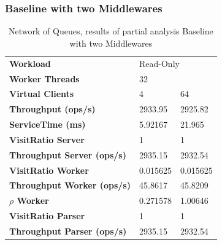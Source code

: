 \documentclass[11pt,a4paper]{article}
\begin{document}
\newpage
\subsubsection*{Baseline with two Middlewares}

\begin{table}[!htb]
\centering
    \caption{Network of Queues, results of partial analysis Baseline with two Middlewares}
\begin{tabular}{lll}
\toprule
    \textbf{Workload}& \multicolumn{2}{l}{Read-Only} \\
    \textbf{Worker Threads} & \multicolumn{2}{l}{32} \\
    \textbf{Virtual Clients} &        4  &        64 \\
\midrule
    \textbf{Throughput (ops/s)}                 &   2933.95 &   2925.82 \\
    \textbf{ServiceTime (ms)}                   &   5.92167 &    21.965 \\   
    \textbf{VisitRatio Server}                  &         1 &         1 \\
    \textbf{Throughput Server (ops/s)}          &   2935.15 &   2932.54 \\        
    \textbf{VisitRatio Worker}                  &  0.015625 &  0.015625 \\ 
    \textbf{Throughput Worker (ops/s)}          &   45.8617 &   45.8209 \\ 
    \textbf{$\rho$ Worker}                      &  0.271578 &   1.00646 \\
    \textbf{VisitRatio Parser}                  &         1 &         1 \\
    \textbf{Throughput Parser (ops/s)}          &   2935.15 &   2932.54 \\
\bottomrule
\end{tabular}
\end{table}
\end{document}
